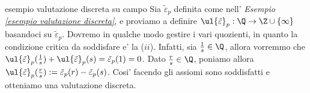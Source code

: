 \begin{example}{esempio valutazione discreta su campo}
  Sia $\tilde{\varepsilon}_p$ definita come nell' \emph{Esempio \ref{esempio valutazione discreta}}, e proviamo a definire
  $\ul{\tilde{\varepsilon}}_p : \Q \rightarrow \Z \cup \{ \infty \}$ basandoci su $\tilde{\varepsilon}_p$. Dovremo in qualche modo gestire i vari quozienti, 
  in quanto la condizione critica da soddisfare e' la ($ii$). Infatti, sia $\frac{1}{s} \in \Q$, allora vorremmo che 
  $\ul{\tilde{\varepsilon}}_p(\frac{1}{s}) + \ul{\tilde{\varepsilon}}_p(s) = \tilde{\varepsilon}_p(1) = 0$. Dato $\frac{r}{s} \in \Q$, poniamo allora
  \mbox{$\ul{\tilde{\varepsilon}}_p(\frac{r}{s}) := \tilde{\varepsilon}_p(r) - \tilde{\varepsilon}_p(s)$}. Cosi' facendo gli assiomi sono 
  soddisfatti e otteniamo una valutazione discreta.
\end{example}